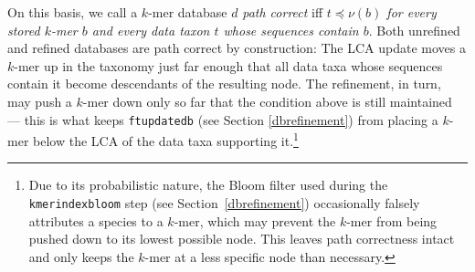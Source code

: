 \documentclass[pdflatex,sn-vancouver-num]{sn-jnl}
\begin{document}
    On this basis, we call a $k$-mer database $d$ \emph{path correct} iff \emph{$t \preceq \nu(b)$ for every stored $k$-mer $b$ and every data taxon $t$ whose sequences contain $b$}. Both unrefined and refined databases are path correct by construction: The LCA update moves a $k$-mer up in the taxonomy just far enough that all data taxa whose sequences contain it become descendants of the resulting node. The refinement, in turn, may push a $k$-mer down only so far that the condition above is still maintained --- this is what keeps \verb|ftupdatedb| (see Section \ref{dbrefinement}) from placing a $k$-mer below the LCA of the data taxa supporting it.\footnote{Due to its probabilistic nature, the Bloom filter used during the \texttt{kmerindexbloom} step (see Section~\ref{dbrefinement}) occasionally falsely attributes a species to a $k$-mer, which may prevent the $k$-mer from being pushed down to its lowest possible node. This leaves path correctness intact and only keeps the $k$-mer at a less specific node than necessary.}
\end{document}
